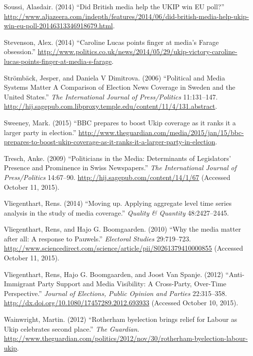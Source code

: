 \documentclass[12pt,article]{article}
\begin{document}
\hypertarget{ref-Soussi:vy}{}
Soussi, Alasdair. (2014) ``Did British media help the UKIP win EU
poll?''
\url{http://www.aljazeera.com/indepth/features/2014/06/did-british-media-help-ukip-win-eu-poll-20146313346918679.html}.

\hypertarget{ref-Stevenson:wo}{}
Stevenson, Alex. (2014) ``Caroline Lucas points finger at media's Farage
obsession.''
\url{http://www.politics.co.uk/news/2014/05/29/ukip-victory-caroline-lucas-points-finger-at-media-s-farage}.

\hypertarget{ref-Stromback:2006ht}{}
Strömbäck, Jesper, and Daniela V Dimitrova. (2006) ``Political and Media
Systems Matter A Comparison of Election News Coverage in Sweden and the
United States.'' \emph{The International Journal of Press/Politics}
11:131--147.
\url{http://hij.sagepub.com.libproxy.temple.edu/content/11/4/131.abstract}.

\hypertarget{ref-Sweeney:wp}{}
Sweeney, Mark. (2015) ``BBC prepares to boost Ukip coverage as it ranks
it a larger party in election.''
\url{http://www.theguardian.com/media/2015/jan/15/bbc-prepares-to-boost-ukip-coverage-as-it-ranks-it-a-larger-party-in-election}.

\hypertarget{ref-treschux5fpoliticiansux5f2009}{}
Tresch, Anke. (2009) ``Politicians in the Media: Determinants of
Legislators' Presence and Prominence in Swiss Newspapers.'' \emph{The
International Journal of Press/Politics} 14:67--90.
\url{http://hij.sagepub.com/content/14/1/67} (Accessed October 11,
2015).

\hypertarget{ref-Vliegenthart:2014di}{}
Vliegenthart, Rens. (2014) ``Moving up. Applying aggregate level time
series analysis in the study of media coverage.'' \emph{Quality \&
Quantity} 48:2427--2445.

\hypertarget{ref-vliegenthartux5fwhyux5f2010}{}
Vliegenthart, Rens, and Hajo G. Boomgaarden. (2010) ``Why the media
matter after all: A response to Pauwels.'' \emph{Electoral Studies}
29:719--723.
\url{http://www.sciencedirect.com/science/article/pii/S0261379410000855}
(Accessed October 11, 2015).

\hypertarget{ref-vliegenthartux5fanti-immigrantux5f2012}{}
Vliegenthart, Rens, Hajo G. Boomgaarden, and Joost Van Spanje. (2012)
``Anti-Immigrant Party Support and Media Visibility: A Cross-Party,
Over-Time Perspective.'' \emph{Journal of Elections, Public Opinion and
Parties} 22:315--358.
\url{http://dx.doi.org/10.1080/17457289.2012.693933} (Accessed October
10, 2015).

\hypertarget{ref-wainwrightux5frotherhamux5f2012}{}
Wainwright, Martin. (2012) ``Rotherham byelection brings relief for
Labour as Ukip celebrates second place.'' \emph{The Guardian}.
\url{http://www.theguardian.com/politics/2012/nov/30/rotherham-byelection-labour-ukip}.
\end{document}
